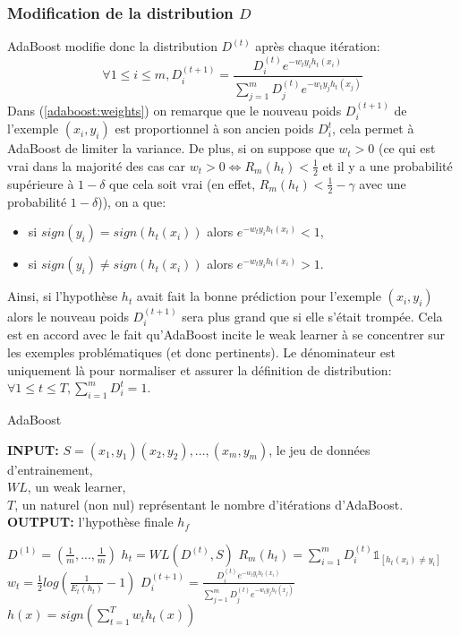 \documentclass[12pt]{article}
\begin{document}
	
	\subsubsection{Modification de la distribution $D$}
	\label{adaboost:newdistrib}
	AdaBoost modifie donc la distribution $D^{(t)}$ après chaque itération: 
	\begin{equation}
		\label{adaboost:weights}
		\forall 1 \leq i \leq m, D^{(t+1)}_i = \frac{D^{(t)}_i e^{-w_t y_i h_t(x_i)}}{\sum_{j=1}^m D^{(t)}_j e^{-w_t y_j h_t(x_j)}} 
	\end{equation}   
	Dans (\ref{adaboost:weights}) on remarque que le nouveau poids $D^{(t+1)}_i$ de l'exemple $(x_i,y_i)$ est proportionnel à son ancien poids $D^{t}_i$, cela permet à AdaBoost de limiter la variance. De plus, si on suppose que $w_t > 0$ (ce qui est vrai dans la majorité des cas car $w_t > 0 \Leftrightarrow R_m(h_t) < \frac{1}{2}$ et il y a une probabilité supérieure à $1-\delta$ que cela soit vrai (en effet, $R_m(h_t) < \frac{1}{2} - \gamma$ avec une probabilité $1-\delta$)), on a que:
	\begin{itemize}
		\item si $sign(y_i)=sign(h_t(x_i))$ alors $e^{-w_t y_i h_t(x_i)} < 1$,
		\item si $sign(y_i) \neq sign(h_t(x_i))$ alors $e^{-w_t y_i h_t(x_i)} > 1$. 
	\end{itemize}
	Ainsi, si l'hypothèse $h_t$ avait fait la bonne prédiction pour l'exemple $(x_i,y_i)$ alors le nouveau poids $D^{(t+1)}_i$ sera plus grand que si elle s'était trompée. Cela est en accord avec le fait qu'AdaBoost incite le weak learner à se concentrer sur les exemples problématiques (et donc pertinents).
	Le dénominateur est uniquement là pour normaliser et assurer la définition de distribution: $\forall 1 \leq t \leq T, \sum_{i=1}^m D^t_i = 1$.
	
	
	\begin{algorithm}[H]
		\caption{AdaBoost}
		\label{adaboost:algo}
		\begin{flushleft}
			\textbf{INPUT:} $S=(x_1,y_1)(x_2,y_2),...,(x_m,y_m)$, le jeu de données d'entrainement,\\
			\hspace{1.5cm} $WL$, un weak learner,\\
			\hspace{1.5cm} $T$, un naturel (non nul) représentant le nombre d'itérations d'AdaBoost.\\
			\textbf{OUTPUT:} l'hypothèse finale $h_f$
		\end{flushleft}
		\begin{algorithmic}[1]
			\State $D^{(1)}=(\frac{1}{m},...,\frac{1}{m})$
			\State $h_t = WL(D^{(t)},S)$
			\State $R_m(h_t)= \sum_{i=1}^m D^{(t)}_i \mathbb{1}_{[h_t(x_i) \neq y_i]}$
			\State $w_t = \frac{1}{2} log(\frac{1}{E_t(h_t)} - 1)$
			\State $D^{(t+1)}_i = \frac{D^{(t)}_i e^{-w_t y_i h_t(x_i)}}{\sum_{j=1}^m D^{(t)}_j e^{-w_t y_j h_t(x_j)}}$ 
			\EndFor
			\EndFor
			\State $h(x) = sign (\sum_{t=1}^T w_t h_t(x))$
			\State {}
			\EndFunction
		\end{algorithmic}
	\end{algorithm}
	
\end{document}
